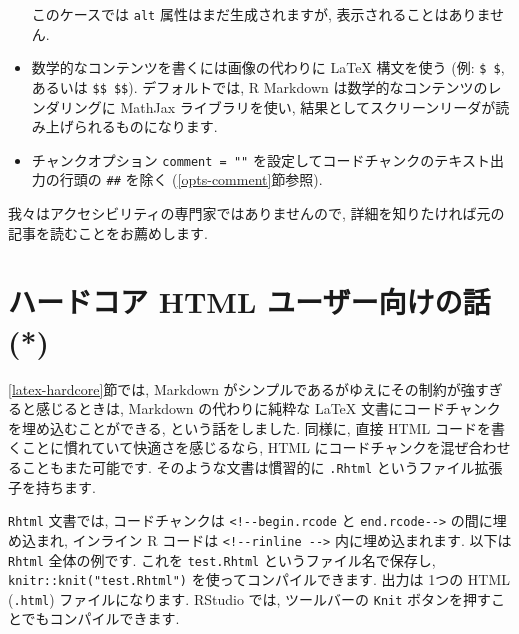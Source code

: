 \documentclass[
  11pt,
  lualatex,
  ja=standard]{bxjsreport}
\begin{document}
\begin{itemize}
  このケースでは \texttt{alt} 属性はまだ生成されますが, 表示されることはありません.
\item
  数学的なコンテンツを書くには画像の代わりに LaTeX 構文を使う (例: \texttt{\$ \$}, あるいは \texttt{\$\$ \$\$}). デフォルトでは, R Markdown は数学的なコンテンツのレンダリングに MathJax ライブラリを使い, 結果としてスクリーンリーダが読み上げられるものになります.
\item
  チャンクオプション \texttt{comment = ""} を設定してコードチャンクのテキスト出力の行頭の \texttt{\#\#} を除く (\ref{opts-comment}節参照).
\end{itemize}

我々はアクセシビリティの専門家ではありませんので, 詳細を知りたければ元の記事を読むことをお薦めします.

\hypertarget{html-hardcore}{%
\section{ハードコア HTML ユーザー向けの話 (*)}\label{html-hardcore}}

\ref{latex-hardcore}節では, Markdown がシンプルであるがゆえにその制約が強すぎると感じるときは, Markdown の代わりに純粋な LaTeX 文書にコードチャンクを埋め込むことができる, という話をしました. 同様に, 直接 HTML コードを書くことに慣れていて快適さを感じるなら, HTML にコードチャンクを混ぜ合わせることもまた可能です. そのような文書は慣習的に \texttt{.Rhtml} というファイル拡張子を持ちます.

\texttt{Rhtml} 文書では, コードチャンクは \texttt{\textless{}!-\/-begin.rcode} と \texttt{end.rcode-\/-\textgreater{}} の間に埋め込まれ, インライン R コードは \texttt{\textless{}!-\/-rinline\ -\/-\textgreater{}} 内に埋め込まれます. 以下は \texttt{Rhtml} 全体の例です. これを \texttt{test.Rhtml} というファイル名で保存し, \texttt{knitr::knit("test.Rhtml")} を使ってコンパイルできます. 出力は 1つの HTML (\texttt{.html}) ファイルになります. RStudio では, ツールバーの \texttt{Knit} ボタンを押すことでもコンパイルできます.
\end{document}
